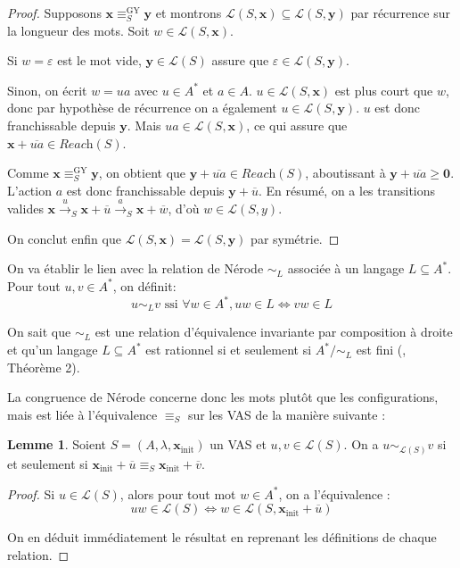 \documentclass[a4paper,final]{article}
\theoremstyle{definition}
\newtheorem{Lemma}[Theorem]{Lemme}
\let\epsilon\varepsilon
\let\geq\geqslant
\newcommand{\lang}{\ensuremath{\mathcal{L}}}
\newcommand{\reach}{\ensuremath{\textit{Reach}}}
\newcommand{\trans}[2]{\ensuremath{\stackrel{#1}{\longrightarrow}_{#2}}}
\newcommand{\vect}[1]{\ensuremath{\mathbf{#1}}}
\newcommand{\rel}{\ensuremath{\equiv}}
\newcommand{\relGY}{\ensuremath{\equiv^\text{GY}_S}}
\newcommand{\ssi}{\ensuremath{\text{ ssi }}}
\newcommand{\equivaut}{\ensuremath{\Leftrightarrow}}
\newcommand{\xinit}{\ensuremath{\vect{x}_\text{init}}}
\newcommand{\valeur}[1]{\ensuremath{\overline{#1}}}
\begin{document}
\begin{proof}
Supposons $\vect{x} \relGY \vect{y}$ et montrons $\lang(S,\vect{x}) \subseteq \lang(S,\vect{y})$ par récurrence sur la longueur des mots.
Soit $w\in\lang(S,\vect{x})$.

Si $w=\epsilon$ est le mot vide, $\vect{y} \in\lang(S)$ assure que $\epsilon\in\lang(S,\vect{y})$.

Sinon, on écrit $w=ua$ avec $u\in A^\ast$ et $a\in A$.
$u\in\lang(S,\vect{x})$ est plus court que $w$, donc par hypothèse de récurrence on a également $u\in\lang(S,\vect{y})$.
$u$ est donc franchissable depuis $\vect{y}$.
Mais $ua\in\lang(S,\vect{x})$, ce qui assure que $\vect{x} +\valeur{ua}\in\reach(S)$.

Comme $\vect{x} \relGY \vect{y}$, on obtient que $\vect{y} +\valeur{ua} \in\reach(S)$, aboutissant à $\vect{y} +\valeur{ua} \geq\vect{0}$.
L'action $a$ est donc franchissable depuis $\vect{y} +\valeur{u}$.
En résumé, on a les transitions valides $\vect{x} \trans{u}{S} \vect{x} +\valeur{u} \trans{a}{S} \vect{x} +\valeur{w}$, d'où $w\in\lang(S,y)$.

On conclut enfin que $\lang(S,\vect{x}) = \lang(S,\vect{y})$ par symétrie.
\end{proof}

On va établir le lien avec la relation de Nérode $\sim_L$ associée à un langage $L \subseteq A^*$. 
Pour tout $u,v\in A^\ast$, on définit: 
$$ u\sim_L v \ssi \forall w\in A^\ast, uw\in L \equivaut vw\in L $$


On sait que $\sim_L$ est une relation d'équivalence invariante par composition à droite et qu'un langage $L \subseteq A^*$ est rationnel si et seulement si $A^*/\sim_L$ est fini (\cite{rasc59}, Théorème 2).


La congruence de Nérode concerne donc les mots plutôt que les configurations, mais est liée à l'équivalence $ \rel_S$ sur les VAS de la manière suivante :

\begin{Lemma}\label{lien avec Nérode}
    Soient $S=(A,\lambda,\xinit)$ un VAS et $u,v\in\lang(S)$.
    On a $u\sim_{\lang(S)}v$ si et seulement si $\xinit +\valeur{u} \rel_S \xinit +\valeur{v}$.
\end{Lemma}

\begin{proof}
Si $u\in\lang(S)$, alors pour tout mot $w\in A^\ast$, on a l'équivalence :
$$uw\in\lang(S) \equivaut w\in\lang(S,\xinit +\valeur{u})$$

On en déduit immédiatement le résultat en reprenant les définitions de chaque relation.
\end{proof}
\end{document}
